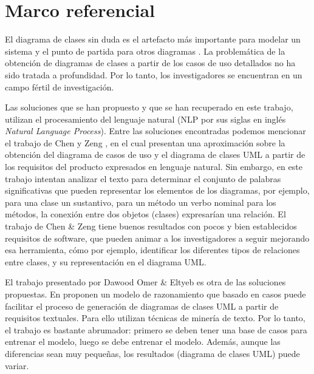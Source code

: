 \section{Marco referencial}

El diagrama de clases sin duda es el artefacto más importante para modelar un sistema y el punto de partida para otros diagramas \cite{Tan2010}. La problemática de la obtención de diagramas de clases a partir de los casos de uso detallados no ha sido tratada a profundidad. Por lo tanto, los investigadores se encuentran en un campo fértil de investigación.

Las soluciones que se han propuesto y que se han recuperado en este trabajo, utilizan el procesamiento del lenguaje natural (NLP por sus siglas en inglés \textit{Natural Language Process}). Entre las soluciones encontradas podemos mencionar el trabajo de Chen y Zeng \cite{Chen2010}, en el cual presentan una aproximación sobre la obtención del diagrama de casos de uso y el diagrama de clases UML a partir de los requisitos del producto expresados en lenguaje natural. Sin embargo, en este trabajo intentan analizar el texto para determinar el conjunto de palabras significativas que pueden representar los elementos de los diagramas, por ejemplo, para una clase un sustantivo, para un método un verbo nominal para los métodos, la conexión entre dos objetos (clases) expresarían una relación. El trabajo de Chen \& Zeng \cite{Chen2010} tiene buenos resultados con pocos y bien establecidos requisitos de software, que pueden animar a los investigadores a seguir mejorando esa herramienta, cómo por ejemplo, identificar los diferentes tipos de relaciones entre clases, y su representación en el diagrama UML.

El trabajo presentado por Dawood Omer \& Eltyeb \cite{Dawood2022} es otra de las soluciones propuestas. En \cite{Dawood2022} proponen un modelo de razonamiento que basado en casos puede facilitar el proceso de generación de diagramas de clases UML a partir de requisitos textuales. Para ello utilizan técnicas de minería de texto. Por lo tanto, el trabajo es bastante abrumador: primero se deben tener una base de casos para entrenar el modelo, luego se debe entrenar el modelo. Además, aunque las diferencias sean muy pequeñas, los resultados (diagrama de clases UML) puede variar.

